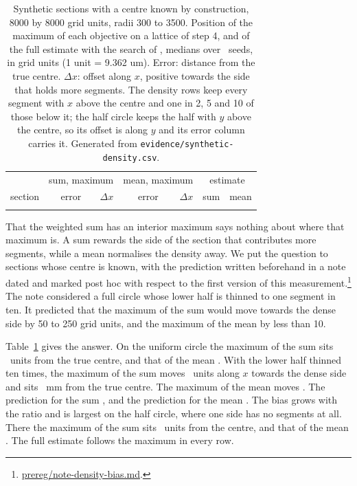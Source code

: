 \begin{table}[t]
\caption{Synthetic sections with a centre known by construction, 8000 by 8000 grid units, radii
300 to 3500. Position of the maximum of each objective on a lattice of step 4, and of the full
estimate with the search of , medians over \RevDensSeeds\ seeds, in grid units
(1 unit = 9.362 um). Error: distance from the true centre. $\Delta x$: offset along $x$, positive
towards the side that holds more segments. The density rows keep every segment with $x$ above the
centre and one in 2, 5 and 10 of those below it; the half circle keeps the half with $y$ above the
centre, so its offset is along $y$ and its error column carries it. Generated from
\texttt{evidence/synthetic-density.csv}.}
\label{tab:density}
\centering
\footnotesize
\setlength{\tabcolsep}{3pt}
\begin{tabular}{@{}lrrrrrr@{}}
\toprule
 & \multicolumn{2}{c}{sum, maximum} & \multicolumn{2}{c}{mean, maximum} & \multicolumn{2}{c}{estimate} \\
section & error & $\Delta x$ & error & $\Delta x$ & sum & mean \\
\midrule
{}{rev1-density}
\bottomrule
\end{tabular}
\end{table}

That the weighted sum has an interior maximum says nothing about where that maximum is. A sum
rewards the side of the section that contributes more segments, while a mean normalises the density
away. We put the question to sections whose centre is known, with the prediction written
beforehand in a note dated and marked post hoc with respect to the first version of this
measurement.\footnote{\url{prereg/note-density-bias.md}.} The note considered a full circle whose
lower half is thinned to one segment in ten. It predicted that the maximum of the sum would move
towards the dense side by 50 to 250 grid units, and the maximum of the mean by less than 10.

Table~\ref{tab:density} gives the answer. On the uniform circle the maximum of the sum sits
\RevDensCircleOneSumFieldErr\ units from the true centre, and that of the mean
\RevDensCircleOneMeanFieldErr. With the lower half thinned ten times, the maximum of the sum moves
\RevDensDensTenSumFieldDx\ units along $x$ towards the dense side and sits
\RevDensDensTenSumFieldErrMm~mm from the true centre. The maximum of the mean moves \RevDensDensTenMeanFieldDx. The
prediction for the sum \RevDensPredictionSum, and the prediction for the mean
\RevDensPredictionMean. The bias grows with the ratio and is largest on the half circle, where one
side has no segments at all. There the maximum of the sum sits \RevDensHalfSumFieldErr\ units from
the centre, and that of the mean \RevDensHalfMeanFieldErr. The full estimate follows the maximum in
every row.

